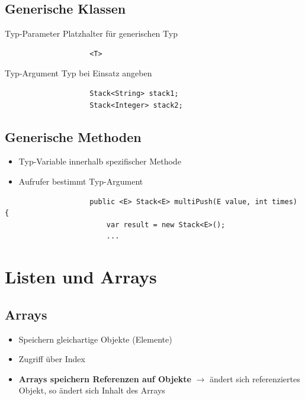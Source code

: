 \documentclass[a4paper, landscape, 8pt]{scrartcl}
\begin{document}
\begin{multicols*}{4}
            \subsection{Generische Klassen}
                \textcolor{subsectioncolor}{Typ-Parameter}
                \newline
                Platzhalter für generischen Typ
                \begin{lstlisting}
                    <T>
                \end{lstlisting}

                \textcolor{subsectioncolor}{Typ-Argument}
                \newline
                Typ bei Einsatz angeben
                \begin{lstlisting}
                    Stack<String> stack1;
                    Stack<Integer> stack2;
                \end{lstlisting}

            \subsection{Generische Methoden}
                \begin{itemize}
                    \item Typ-Variable innerhalb spezifischer Methode
                    \item Aufrufer bestimmt Typ-Argument
                \end{itemize}
                \begin{lstlisting}
                    public <E> Stack<E> multiPush(E value, int times) {
                        var result = new Stack<E>();
                        ...
                \end{lstlisting}

        \section{Listen und Arrays}
            \subsection{Arrays}
                \begin{itemize}
                    \item Speichern gleichartige Objekte (Elemente)
                    \item Zugriff über Index
                    \item {\bfseries Arrays speichern Referenzen auf Objekte} $\to$ ändert sich referenziertes Objekt,
                    so ändert sich Inhalt des Arrays
                \end{itemize}
        

\end{multicols*}
\end{document}
